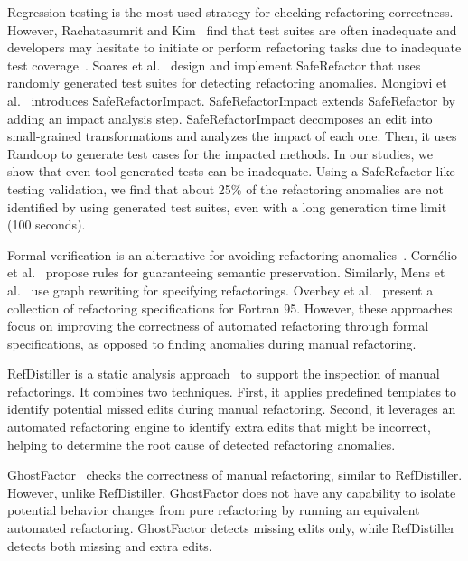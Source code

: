 \documentclass[runningheads,a4paper]{llncs}
\begin{document}
Regression testing is the most used strategy for checking refactoring correctness. However, Rachatasumrit and Kim~\cite{Rachatasumrit2012:refactortest} find that test suites are often inadequate and developers may hesitate to initiate or perform refactoring tasks due to inadequate test coverage~\cite{Kim2012:FSR}. Soares et al.~\cite{Soares:icse10} design and implement SafeRefactor that uses randomly generated test suites for detecting refactoring anomalies. Mongiovi et al.~\cite{mongiovi2013making} introduces SafeRefactorImpact. SafeRefactorImpact extends SafeRefactor by adding an impact analysis step. SafeRefactorImpact decomposes an edit into small-grained transformations and analyzes the impact of each one. Then, it uses Randoop to generate test cases for the impacted methods. In our studies, we show that even tool-generated tests can be inadequate. Using a SafeRefactor like testing validation, we find that about 25\% of the refactoring anomalies are not identified by using generated test suites, even with a long generation time limit (100 seconds). 

Formal verification is an alternative for avoiding refactoring anomalies~\cite{Mens2004:SSR}. Corn\'elio et al.~\cite{cornelio2010sound} propose rules for guaranteeing semantic preservation. Similarly, Mens et al.~\cite{mens2005formalizing} use graph rewriting for specifying refactorings. Overbey et al.~\cite{overbey2010collection} present a collection of refactoring specifications for Fortran 95. However, these approaches focus on improving the correctness of automated refactoring through formal specifications, as opposed to finding anomalies during manual refactoring. 


RefDistiller is a static analysis approach~\cite{Alves2017:refdistiller,Alves:2014:RRA:2635868.2661674} to support the inspection of manual refactorings. It combines two techniques. First, it applies predefined templates to identify potential missed edits during manual refactoring. Second, it leverages an automated refactoring engine to identify extra edits that might be incorrect, helping to  determine the root cause of detected refactoring anomalies.

GhostFactor~\cite{geManual2014} checks the correctness of manual refactoring, similar to RefDistiller. 
However, unlike RefDistiller, GhostFactor does not have any capability to isolate potential behavior changes from pure refactoring by running an equivalent automated refactoring. GhostFactor detects missing edits only, while RefDistiller detects both missing and extra edits. 
\end{document}
